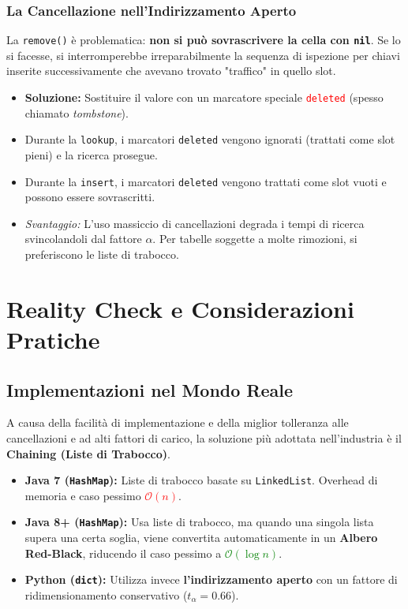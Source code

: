 \documentclass[12pt, a4paper]{article}
\begin{document}
\subsubsection{La Cancellazione nell'Indirizzamento Aperto}
La \texttt{remove()} è problematica: \textbf{non si può sovrascrivere la cella con \texttt{nil}}. Se lo si facesse, si interromperebbe irreparabilmente la sequenza di ispezione per chiavi inserite successivamente che avevano trovato "traffico" in quello slot.
\begin{itemize}
\item \textbf{Soluzione:} Sostituire il valore con un marcatore speciale \textcolor{red}{\texttt{deleted}} (spesso chiamato \textit{tombstone}).
\item Durante la \texttt{lookup}, i marcatori \texttt{deleted} vengono ignorati (trattati come slot pieni) e la ricerca prosegue.
\item Durante la \texttt{insert}, i marcatori \texttt{deleted} vengono trattati come slot vuoti e possono essere sovrascritti.
\item \textit{Svantaggio:} L'uso massiccio di cancellazioni degrada i tempi di ricerca svincolandoli dal fattore $\alpha$. Per tabelle soggette a molte rimozioni, si preferiscono le liste di trabocco.
\end{itemize}

\newpage

\section{Reality Check e Considerazioni Pratiche}

\subsection{Implementazioni nel Mondo Reale}
A causa della facilità di implementazione e della miglior tolleranza alle cancellazioni e ad alti fattori di carico, la soluzione più adottata nell'industria è il \textbf{Chaining (Liste di Trabocco)}.
\begin{itemize}
\item \textbf{Java 7 (\texttt{HashMap}):} Liste di trabocco basate su \texttt{LinkedList}. Overhead di memoria e caso pessimo \textcolor{red}{$\mathcal{O}(n)$}.
\item \textbf{Java 8+ (\texttt{HashMap}):} Usa liste di trabocco, ma quando una singola lista supera una certa soglia, viene convertita automaticamente in un \textbf{Albero Red-Black}, riducendo il caso pessimo a \textcolor{green}{$\mathcal{O}(\log n)$}.
\item \textbf{Python (\texttt{dict}):} Utilizza invece \textbf{l'indirizzamento aperto} con un fattore di ridimensionamento conservativo ($t_\alpha = 0.66$).
\end{itemize}
\end{document}
